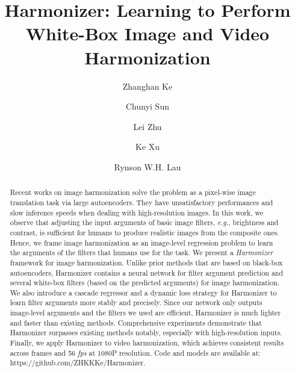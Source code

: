 \documentclass[runningheads]{llncs}
\newcommand{\ke}[1]{{\color{black}#1}}
\begin{document}
\pagestyle{headings}
\mainmatter
\def\ECCVSubNumber{3203}  

\title{Harmonizer: Learning to Perform White-Box Image and Video Harmonization} 

\begin{comment}
\titlerunning{ECCV-22 submission ID \ECCVSubNumber} 
\authorrunning{ECCV-22 submission ID \ECCVSubNumber} 
\author{Anonymous ECCV submission}
\institute{Paper ID \ECCVSubNumber}
\end{comment}


\author{
Zhanghan Ke \and
Chunyi Sun \and
Lei Zhu \and
Ke Xu \and 
Rynson W.H. Lau
}
\maketitle

\begin{abstract}
Recent works on image harmonization solve the problem as a pixel-wise image translation task via large autoencoders. They have unsatisfactory performances and slow inference speeds when dealing with high-resolution images.
In this work, we observe that adjusting the input arguments of basic image filters, {\it e.g.}, brightness and contrast, is sufficient for humans to produce realistic images from the composite ones.
Hence, we frame image harmonization as an image-level regression problem to learn the arguments of the filters that humans use for the task. We present a \textit{Harmonizer} framework for image harmonization. 
Unlike prior methods that are based on black-box autoencoders, Harmonizer contains a neural network for filter argument prediction and several white-box filters (based on the predicted arguments) for image harmonization. We \ke{also} introduce a cascade regressor and a dynamic loss strategy for Harmonizer to learn filter arguments more \ke{stably} and precisely.
Since our network only outputs image-level arguments and the filters we used are efficient, Harmonizer is much lighter and faster than existing methods. Comprehensive experiments demonstrate that Harmonizer surpasses existing methods notably, especially with high-resolution inputs. Finally, we apply Harmonizer to video harmonization, which achieves consistent results across frames and 56 {\it fps} at 1080P resolution. 
Code and models are available at: {\color{blue}https://github.com/ZHKKKe/Harmonizer}.
\end{abstract}
\end{document}
